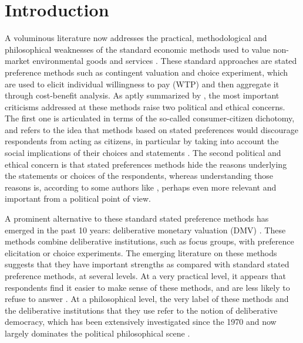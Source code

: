 \documentclass[version=3.21, pagesize, twoside=off, bibliography=totoc, DIV=calc, fontsize=12pt, a4paper, french, english]{scrartcl}
\begin{document}
\section{Introduction}
A voluminous literature now addresses the practical, methodological and philosophical weaknesses of the standard economic methods used to value non-market environmental goods and services \citep{meinard_ethical_2016}. These standard approaches are stated preference methods such as contingent valuation and choice experiment, which are used to elicit individual willingness to pay (WTP) and then aggregate it through cost-benefit analysis. As aptly summarized by \citet{bartkowski_beyond_2018}, the most important criticisms addressed at these methods raise two political and ethical concerns. The first one is articulated in terms of the so-called consumer-citizen dichotomy, and refers to the idea that methods based on stated preferences would discourage respondents from acting as citizens, in particular by taking into account the social implications of their choices and statements \citep{soma_representing_2014, vatn_institutional_2009}. The second political and ethical concern is that stated preferences methods hide the reasons underlying the statements or choices of the respondents, whereas understanding those reasons is, according to some authors like \citet{sen_environmental_1995}, perhaps even more relevant and important from a political point of view. 

A prominent alternative to these standard stated preference methods has emerged in the past 10 years: deliberative monetary valuation (DMV) \citep{spash_deliberative_2007,bartkowski_economic_2017}. These methods combine deliberative institutions, such as focus groups, with preference elicitation or choice experiments. The emerging literature on these methods suggests that they have important strengths as compared with standard stated preference methods, at several levels. At a very practical level, it appears that respondents find it easier to make sense of these methods, and are less likely to refuse to answer \citep{lienhoop_contingent_2007,szabo_reducing_2011}. At a philosophical level, the very label of these methods and the deliberative institutions that they use refer to the notion of deliberative democracy, which has been extensively investigated since the 1970 and now largely dominates the political philosophical scene \citep{chappell_deliberative_2012}.
\end{document}
